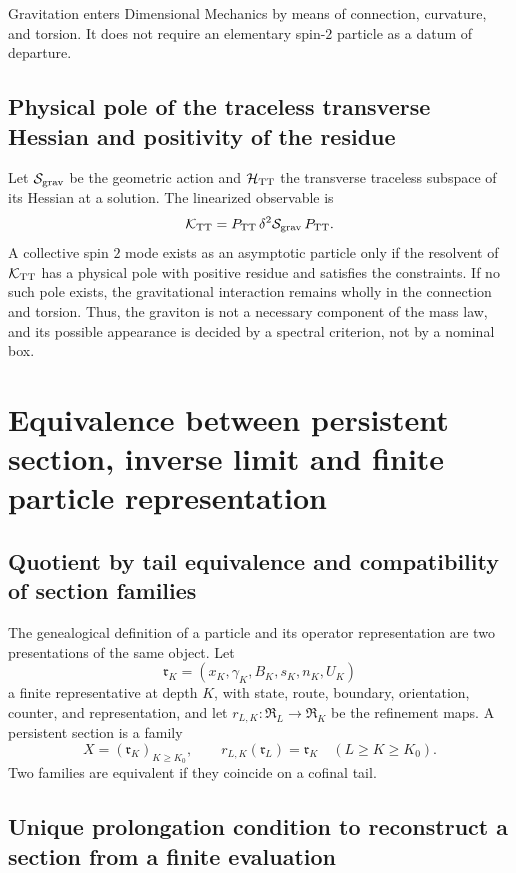Gravitation enters Dimensional Mechanics by means of connection, curvature, and
torsion. It does not require an elementary spin-\(2\) particle as a datum of
departure.

\subsection{Physical pole of the traceless transverse Hessian and positivity of the residue}

Let \(\mathcal S_{\rm grav}\) be the geometric action and
\(\mathcal H_{\rm TT}\) the transverse traceless subspace of its Hessian
at a solution. The linearized observable is
\[
 \mathcal K_{\rm TT}
 =P_{\rm TT}\,\delta^2\mathcal S_{\rm grav}\,P_{\rm TT}.
\]
A collective spin \(2\) mode exists as an asymptotic particle only
if the resolvent of \(\mathcal K_{\rm TT}\) has a physical pole with positive
residue and satisfies the constraints. If no such pole exists, the gravitational
interaction remains wholly in the connection and torsion. Thus, the
graviton is not a necessary component of the mass law, and its possible appearance
is decided by a spectral criterion, not by a nominal box.

\section{Equivalence between persistent section, inverse limit and finite particle representation}

\subsection{Quotient by tail equivalence and compatibility of section families}

The genealogical definition of a particle and its operator representation are
two presentations of the same object. Let
\[
 \mathfrak r_K=(x_K,\gamma_K,B_K,s_K,n_K,U_K)
\]
a finite representative at depth \(K\), with state, route, boundary,
orientation, counter, and representation, and let
\(r_{L,K}:\mathfrak R_L\to\mathfrak R_K\) be the refinement maps. A
persistent section is a family
\[
 X=(\mathfrak r_K)_{K\ge K_0},
 \qquad r_{L,K}(\mathfrak r_L)=\mathfrak r_K
 \quad(L\ge K\ge K_0).
\]
Two families are equivalent if they coincide on a cofinal tail.

\subsection{Unique prolongation condition to reconstruct a section from a finite evaluation}

